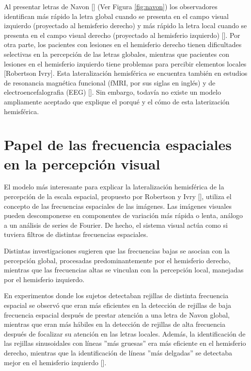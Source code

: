 Al presentar letras de Navon [\cite{navon_forest_1977}] (Ver Figura \ref{fig:navon}) los observadores identifican más rápido la letra global cuando se presenta en el campo visual izquierdo (proyectado al hemisferio derecho) y más rápido la letra local cuando se presenta en el campo visual derecho (proyectado al hemisferio izquierdo) [\cite{navon_forest_1977}]. Por otra parte, los pacientes con lesiones en el hemisferio derecho tienen dificultades selectivas en la percepción de las letras globales, mientras que pacientes con lesiones en el hemisferio izquierdo tiene problemas para percibir elementos locales [Robertson Ivry]. Esta lateralización hemisférica se encuentra también en estudios de resonancia magnética funcional (fMRI, por sus siglas en ingl\'es) \cite{han_hemispheric_2002} y de electroencefalografia (EEG) [\cite{iglesias-fuster_asynchronous_2015}]. Sin embargo, todavía no existe un modelo ampliamente aceptado que explique el porqué y el cómo de esta laterización hemisférica.

\section{Papel de las frecuencia espaciales en la percepción visual}

El modelo más interesante para explicar la lateralización hemisférica de la percepción de la escala espacial, propuesto por Robertson y Ivry [\cite{robertson_hemispheric_2000}], utiliza el concepto de las frecuencias espaciales de las imágenes. Las imágenes visuales pueden descomponerse en componentes de variación más rápida o lenta, análogo a un análisis de series de Fourier. De hecho, el sistema visual actúa como si tuviera filtros de distintas frecuencias espaciales.

Distintas investigaciones sugieren que las frecuencias bajas se asocian con la percepción global, procesadas predominantemente por el hemisferio derecho, mientras que las frecuencias altas se vinculan con la percepción local, manejadas por el hemisferio izquierdo.

En experimentos donde los sujetos detectaban  rejillas de distinta frecuencia espacial se observó que eran más eficientes en la detección de rejillas de baja frecuencia espacial después de prestar atención a una letra de Navon global, mientras que eran más hábiles en la detección de rejillas de alta frecuencia después de focalizar su atención en las letras locales. Además, la identificación de las rejillas sinusoidales con líneas  ”más gruesas” era más eficiente en el hemisferio derecho, mientras que la identificación de líneas ”más delgadas” se detectaba mejor en  el hemisferio izquierdo [\cite{flevaris_local_2010}]. 

